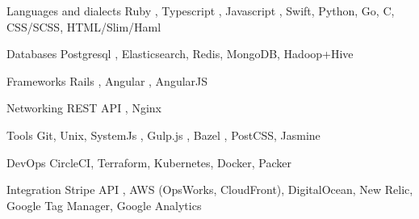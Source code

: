 
\begin{cvskills}

  \cvskill
    {Languages and dialects} %
    {Ruby \cvstar, Typescript \cvstar, Javascript \cvstar, Swift, Python, Go, C, CSS/SCSS, HTML/Slim/Haml} %

  \cvskill
    {Databases} %
    {Postgresql \cvstar, Elasticsearch, Redis, MongoDB, Hadoop+Hive} %

  \cvskill
    {Frameworks} %
    {Rails \cvstar, Angular \cvstar, AngularJS} %

  \cvskill
    {Networking} %
    {REST API \cvstar, Nginx} %

  \cvskill
    {Tools} %
    {Git, Unix, SystemJs \cvstar, Gulp.js \cvstar, Bazel \cvstar, PostCSS, Jasmine} %

  \cvskill
    {DevOps} %
    {CircleCI, Terraform, Kubernetes, Docker, Packer} %


  \cvskill
    {Integration} %
    {Stripe API \cvstar, AWS (OpsWorks, CloudFront), DigitalOcean, New Relic, Google Tag Manager, Google Analytics} %


\end{cvskills}
